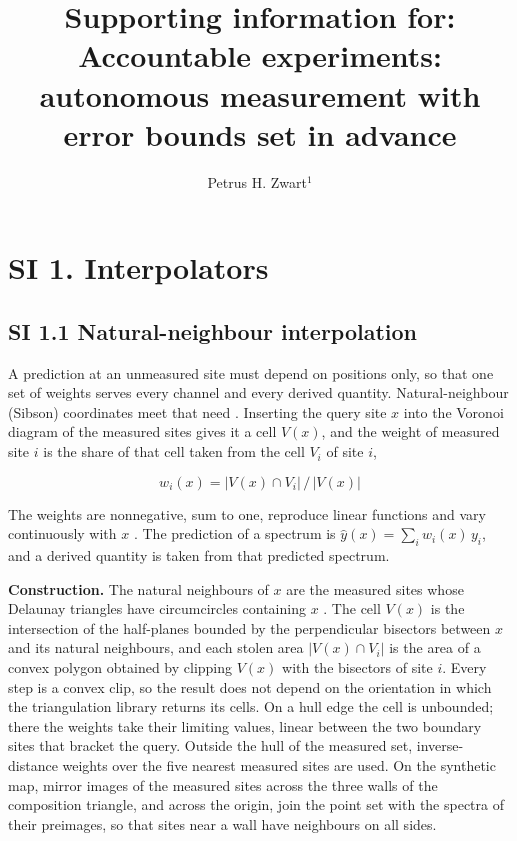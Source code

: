 \documentclass{iopjournal}
\begin{document}

\title{Supporting information for: Accountable experiments: autonomous measurement with error bounds set in advance}

\author{Petrus H. Zwart$^{1}$}


\hypertarget{si-1.-interpolators}{%
\section*{SI 1. Interpolators}\label{si-1.-interpolators}}

\hypertarget{si-1.1-natural-neighbour-interpolation}{%
\subsection*{SI 1.1 Natural-neighbour interpolation}\label{si-1.1-natural-neighbour-interpolation}}

A prediction at an unmeasured site must depend on positions only, so that one set of weights serves every channel and every derived quantity. Natural-neighbour (Sibson) coordinates meet that need \cite{Sibson1981}. Inserting the query site \(x\) into the Voronoi diagram of the measured sites gives it a cell \(V(x)\), and the weight of measured site \(i\) is the share of that cell taken from the cell \(V_i\) of site \(i\),

\[
w_i(x) = |V(x) \cap V_i| \, / \, |V(x)|
\]

The weights are nonnegative, sum to one, reproduce linear functions and vary continuously with \(x\) \cite{Sibson1981}. The prediction of a spectrum is \(\hat y(x) = \sum_i w_i(x) \, y_i\), and a derived quantity is taken from that predicted spectrum.

\textbf{Construction.} The natural neighbours of \(x\) are the measured sites whose Delaunay triangles have circumcircles containing \(x\) \cite{Watson1992}. The cell \(V(x)\) is the intersection of the half-planes bounded by the perpendicular bisectors between \(x\) and its natural neighbours, and each stolen area \(|V(x) \cap V_i|\) is the area of a convex polygon obtained by clipping \(V(x)\) with the bisectors of site \(i\). Every step is a convex clip, so the result does not depend on the orientation in which the triangulation library returns its cells. On a hull edge the cell is unbounded; there the weights take their limiting values, linear between the two boundary sites that bracket the query. Outside the hull of the measured set, inverse-distance weights over the five nearest measured sites are used. On the synthetic map, mirror images of the measured sites across the three walls of the composition triangle, and across the origin, join the point set with the spectra of their preimages, so that sites near a wall have neighbours on all sides.
\end{document}
